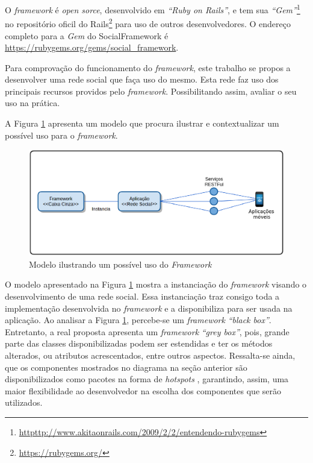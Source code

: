 O \textit{framework} é \textit{open sorce}, desenvolvido em \textit{``Ruby on Rails''}, e tem sua \textit{``Gem''}\footnote{\url{httpttp://www.akitaonrails.com/2009/2/2/entendendo-rubygems}} no repositório oficil do Rails\footnote{\url{https://rubygems.org/}} para uso de outros desenvolvedores. O endereço completo para a \textit{Gem} do SocialFramework é \url{https://rubygems.org/gems/social_framework}.

Para comprovação do funcionamento do \textit{framework}, este trabalho se propos a desenvolver uma rede social que faça uso do mesmo. Esta rede faz uso dos principais recursos providos pelo \textit{framework}. Possibilitando assim, avaliar o seu uso na prática.

A Figura \ref{uso_proposto} apresenta um modelo que procura ilustrar e contextualizar um possível uso para o \textit{framework}.

\begin{figure}[!h]
	\centering
	\includegraphics[scale=0.45]{figuras/proposta/uso_proposto.eps}
	\caption{Modelo ilustrando um possível uso do \textit{Framework}}
	\label{uso_proposto}
\end{figure}

O modelo apresentado na Figura \ref{uso_proposto} mostra a instanciação do \textit{framework}  visando o desenvolvimento de uma rede social. Essa instanciação traz consigo toda a implementação desenvolvida no \textit{framework} e a disponibiliza para ser usada na aplicação. Ao analisar a Figura \ref{uso_proposto}, percebe-se um \textit{framework} \textit{``black box''}. Entretanto, a real proposta apresenta um \textit{framework} \textit{``grey box''}, pois, grande parte das classes disponibilizadas podem ser estendidas e ter os métodos alterados, ou atributos acrescentados, entre outros aspectos. Ressalta-se ainda, que os componentes mostrados no diagrama na seção anterior são disponibilizados como pacotes na forma de \textit{hotspots} \cite{Franca:2001}, garantindo, assim, uma maior flexibilidade ao desenvolvedor na escolha dos componentes que serão utilizados.

